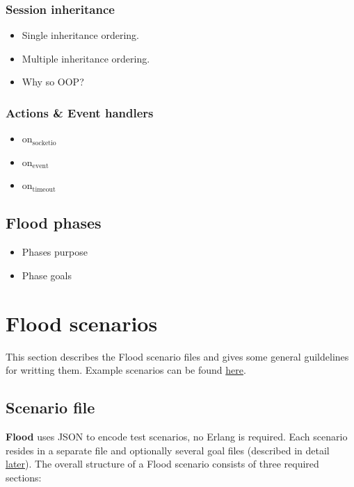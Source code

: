 \documentclass[a4paper]{article}
\begin{document}
\subsubsection{Session inheritance}
\label{sec-2-2-2}


\begin{itemize}
\item Single inheritance ordering.
\item Multiple inheritance ordering.
\item Why so OOP?
\end{itemize}
\subsubsection{Actions \& Event handlers}
\label{sec-2-2-3}


\begin{itemize}
\item on$_{\mathrm{socketio}}$
\item on$_{\mathrm{event}}$
\item on$_{\mathrm{timeout}}$
\end{itemize}
\subsection{Flood phases}
\label{sec-2-3}
\label{ref-goals}



\begin{itemize}
\item Phases purpose
\item Phase goals
\end{itemize}

\pagebreak
\section{Flood scenarios}
\label{sec-3}

This section describes the Flood scenario files and gives some general guildelines for writting them. Example scenarios can be found \hyperref[sec-3-6]{here}.
\subsection{Scenario file}
\label{sec-3-1}

\textbf{Flood} uses JSON to encode test scenarios, no Erlang is required. Each scenario resides in a separate file and optionally several goal files (described in detail \hyperref[sec-4-2]{later}). The overall structure of a Flood scenario consists of three required sections:
\end{document}
